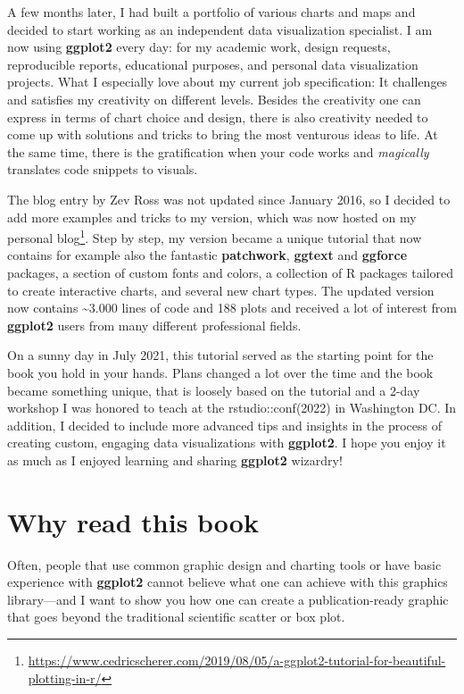 \documentclass[
]{krantz}
\renewcommand{\href}[2]{#2\footnote{\url{#1}}}
\begin{document}
A few months later, I had built a portfolio of various charts and maps and decided to start working as an independent data visualization specialist. I am now using \textbf{ggplot2} every day: for my academic work, design requests, reproducible reports, educational purposes, and personal data visualization projects. What I especially love about my current job specification: It challenges and satisfies my creativity on different levels. Besides the creativity one can express in terms of chart choice and design, there is also creativity needed to come up with solutions and tricks to bring the most venturous ideas to life. At the same time, there is the gratification when your code works and \emph{magically} translates code snippets to visuals.

The blog entry by Zev Ross was not updated since January 2016, so I decided to add more examples and tricks to my version, which was now hosted on my \href{https://www.cedricscherer.com/2019/08/05/a-ggplot2-tutorial-for-beautiful-plotting-in-r/}{personal blog}. Step by step, my version became a unique tutorial that now contains for example also the fantastic \textbf{patchwork}, \textbf{ggtext} and \textbf{ggforce} packages, a section of custom fonts and colors, a collection of R packages tailored to create interactive charts, and several new chart types. The updated version now contains \textasciitilde3.000 lines of code and 188 plots and received a lot of interest from \textbf{ggplot2} users from many different professional fields.

On a sunny day in July 2021, this tutorial served as the starting point for the book you hold in your hands. Plans changed a lot over the time and the book became something unique, that is loosely based on the tutorial and a 2-day workshop I was honored to teach at the rstudio::conf(2022) in Washington DC. In addition, I decided to include more advanced tips and insights in the process of creating custom, engaging data visualizations with \textbf{ggplot2}. I hope you enjoy it as much as I enjoyed learning and sharing \textbf{ggplot2} wizardry!

\hypertarget{why-read-this-book}{%
\section*{Why read this book}\label{why-read-this-book}}


Often, people that use common graphic design and charting tools or have basic experience with \textbf{ggplot2} cannot believe what one can achieve with this graphics library---and I want to show you how one can create a publication-ready graphic that goes beyond the traditional scientific scatter or box plot.
\end{document}
